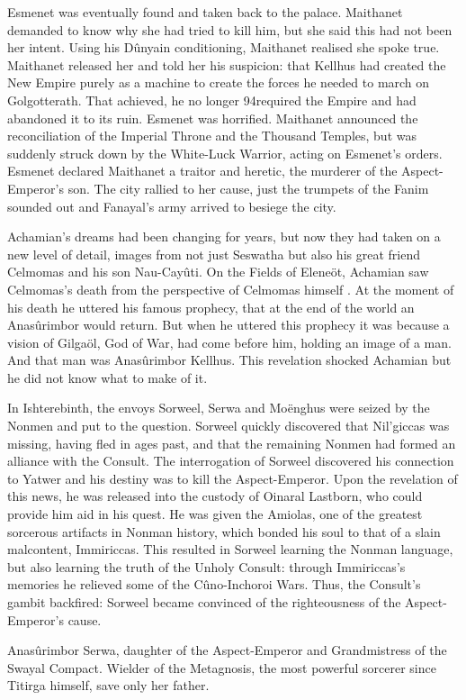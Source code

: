\documentclass[]{book}
\begin{document}
Esmenet was eventually found and taken back to the palace. Maithanet demanded to
know why she had tried to kill him, but she said this had not been her intent. Using his
Dûnyain conditioning, Maithanet realised she spoke true. Maithanet released her and
told her his suspicion: that Kellhus had created the New Empire purely as a machine to
create the forces he needed to march on Golgotterath. That achieved, he no longer
94required the Empire and had abandoned it to its ruin. Esmenet was horrified.
Maithanet announced the reconciliation of the Imperial Throne and the Thousand
Temples, but was suddenly struck down by the White-Luck Warrior, acting on
Esmenet's orders. Esmenet declared Maithanet a traitor and heretic, the murderer of
the Aspect-Emperor's son. The city rallied to her cause, just the trumpets of the Fanim
sounded out and Fanayal's army arrived to besiege the city.

Achamian's dreams had been changing for years, but now they had taken on a new
level of detail, images from not just Seswatha but also his great friend Celmomas and
his son Nau-Cayûti. On the Fields of Eleneöt, Achamian saw Celmomas's death from
the perspective of Celmomas himself . At the moment of his death he uttered his
famous prophecy, that at the end of the world an Anasûrimbor would return. But when
he uttered this prophecy it was because a vision of Gilgaöl, God of War, had come
before him, holding an image of a man. And that man was Anasûrimbor Kellhus. This
revelation shocked Achamian but he did not know what to make of it.

In Ishterebinth, the envoys Sorweel, Serwa and Moënghus were seized by the Nonmen
and put to the question. Sorweel quickly discovered that Nil'giccas was missing, having
fled in ages past, and that the remaining Nonmen had formed an alliance with the
Consult. The interrogation of Sorweel discovered his connection to Yatwer and his
destiny was to kill the Aspect-Emperor. Upon the revelation of this news, he was
released into the custody of Oinaral Lastborn, who could provide him aid in his quest.
He was given the Amiolas, one of the greatest sorcerous artifacts in Nonman history,
which bonded his soul to that of a slain malcontent, Immiriccas. This resulted in
Sorweel learning the Nonman language, but also learning the truth of the Unholy
Consult: through Immiriccas's memories he relieved some of the Cûno-Inchoroi Wars.
Thus, the Consult's gambit backfired: Sorweel became convinced of the righteousness
of the Aspect-Emperor's cause.

Anasûrimbor Serwa, daughter of the Aspect-Emperor and Grandmistress of the Swayal Compact.
Wielder of the Metagnosis, the most powerful sorcerer since Titirga himself, save only her father.
\end{document}
